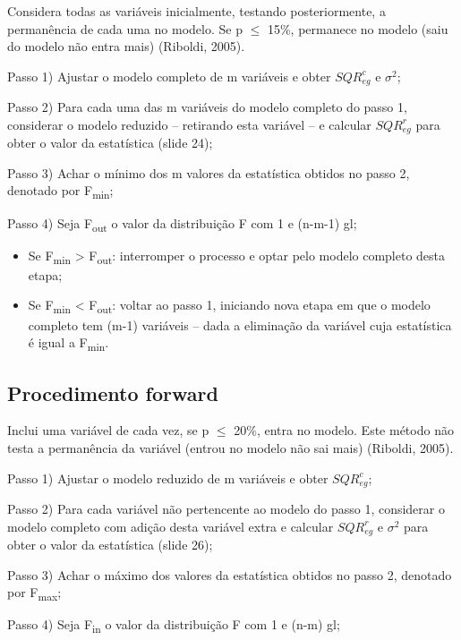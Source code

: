 \documentclass[12pt,brazil,]{book}
\begin{document}
Considera todas as variáveis inicialmente, testando posteriormente, a
permanência de cada uma no modelo. Se p \(\leq\) 15\%, permanece no
modelo (saiu do modelo não entra mais) (Riboldi, 2005).

Passo 1) Ajustar o modelo completo de m variáveis e obter
\(SQR^{c}_{eg}\) e \(\sigma^{2}\);

Passo 2) Para cada uma das m variáveis do modelo completo do passo 1,
considerar o modelo reduzido -- retirando esta variável -- e calcular
\(SQR^{r}_{eg}\) para obter o valor da estatística (slide 24);

Passo 3) Achar o mínimo dos m valores da estatística obtidos no passo 2,
denotado por F\textsubscript{min};

Passo 4) Seja F\textsubscript{out} o valor da distribuição F com 1 e
(n-m-1) gl;

\begin{itemize}
\item
  Se F\textsubscript{min} \textgreater{} F\textsubscript{out}:
  interromper o processo e optar pelo modelo completo desta etapa;
\item
  Se F\textsubscript{min} \textless{} F\textsubscript{out}: voltar ao
  passo 1, iniciando nova etapa em que o modelo completo tem (m-1)
  variáveis -- dada a eliminação da variável cuja estatística é igual a
  F\textsubscript{min}.
\end{itemize}

\hypertarget{procedimento-forward}{%
\subsection{Procedimento forward}\label{procedimento-forward}}

Inclui uma variável de cada vez, se p \(\leq\) 20\%, entra no modelo.
Este método não testa a permanência da variável (entrou no modelo não
sai mais) (Riboldi, 2005).

Passo 1) Ajustar o modelo reduzido de m variáveis e obter
\(SQR^{c}_{eg}\);

Passo 2) Para cada variável não pertencente ao modelo do passo 1,
considerar o modelo completo com adição desta variável extra e calcular
\(SQR^{r}_{eg}\) e \(\sigma^{2}\) para obter o valor da estatística
(slide 26);

Passo 3) Achar o máximo dos valores da estatística obtidos no passo 2,
denotado por F\textsubscript{max};

Passo 4) Seja F\textsubscript{in} o valor da distribuição F com 1 e
(n-m) gl;
\end{document}
